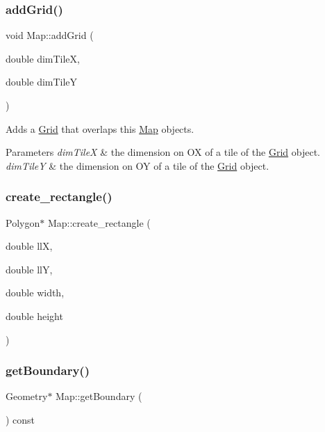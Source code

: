 \subsubsection{\texorpdfstring{addGrid()}{addGrid()}}
{\footnotesize\ttfamily void Map\+::add\+Grid (\begin{DoxyParamCaption}\item[{double}]{dim\+TileX,  }\item[{double}]{dim\+TileY }\end{DoxyParamCaption})}

Adds a \mbox{\hyperlink{class_grid}{Grid}} that overlaps this \mbox{\hyperlink{class_map}{Map}} objects. 
\begin{DoxyParams}{Parameters}
{\em dim\+TileX} & the dimension on OX of a tile of the \mbox{\hyperlink{class_grid}{Grid}} object. \\
\hline
{\em dim\+TileY} & the dimension on OY of a tile of the \mbox{\hyperlink{class_grid}{Grid}} object. \\
\hline
\end{DoxyParams}
\mbox{\label{class_map_a36539152d451138361d82469218b4661}} 
\subsubsection{\texorpdfstring{create\_rectangle()}{create\_rectangle()}}
{\footnotesize\ttfamily Polygon$\ast$ Map\+::create\+\_\+rectangle (\begin{DoxyParamCaption}\item[{double}]{llX,  }\item[{double}]{llY,  }\item[{double}]{width,  }\item[{double}]{height }\end{DoxyParamCaption})\hspace{0.3cm}{\ttfamily [private]}}

\mbox{\label{class_map_a74dd5445ed90bea2a9cc3240bc23f1bc}} 
\subsubsection{\texorpdfstring{getBoundary()}{getBoundary()}}
{\footnotesize\ttfamily Geometry$\ast$ Map\+::get\+Boundary (\begin{DoxyParamCaption}{ }\end{DoxyParamCaption}) const}

